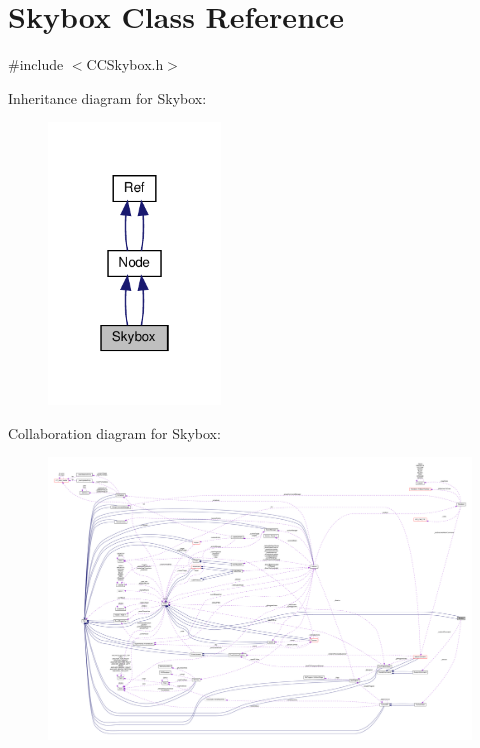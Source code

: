 \hypertarget{classSkybox}{}\section{Skybox Class Reference}
\label{classSkybox}


{\ttfamily \#include $<$C\+C\+Skybox.\+h$>$}



Inheritance diagram for Skybox\+:
\nopagebreak
\begin{figure}[H]
\begin{center}
\leavevmode
\includegraphics[width=130pt]{classSkybox__inherit__graph}
\end{center}
\end{figure}


Collaboration diagram for Skybox\+:
\nopagebreak
\begin{figure}[H]
\begin{center}
\leavevmode
\includegraphics[width=350pt]{classSkybox__coll__graph}
\end{center}
\end{figure}
